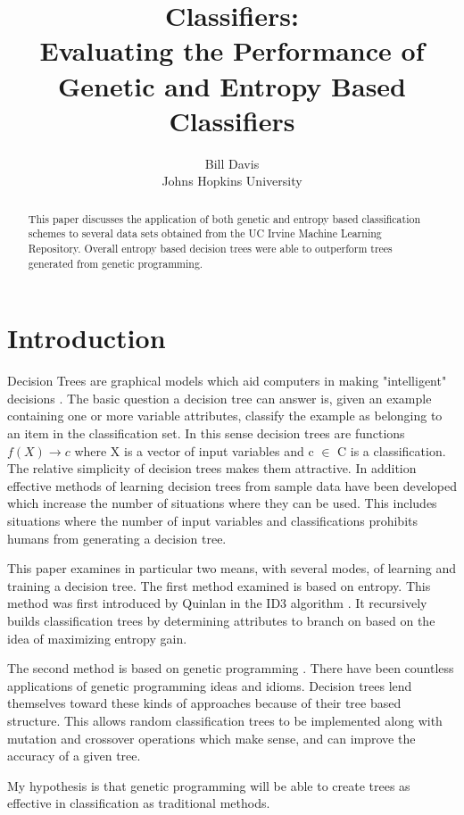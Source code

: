 \documentclass[12pt,letterpaper]{article}
\title{Classifiers: \\ Evaluating the Performance of Genetic and Entropy Based Classifiers}
\author{Bill Davis \\ Johns Hopkins University}
\begin{document}
\maketitle

\begin{abstract}
This paper discusses the application of both genetic and entropy based classification schemes to several data sets obtained from the UC Irvine Machine Learning Repository. Overall entropy based decision trees were able to outperform trees generated from genetic programming.  
\end{abstract}

\section{Introduction}
Decision Trees are graphical models which aid computers in making "intelligent" decisions \cite{aima}. The basic question a decision tree can answer is, given an example containing one or more variable attributes, classify the example as belonging to an item in the classification set. In this sense decision trees are functions $ f(X) \rightarrow c $ where X is a vector of input variables and c $\in$ C is a classification. The relative simplicity of decision trees makes them attractive. In addition effective methods of learning decision trees from sample data have been developed which increase the number of situations where they can be used. This includes situations where the number of input variables and classifications prohibits humans from generating a decision tree. 

This paper examines in particular two means, with several modes, of learning and training a decision tree. The first method examined is based on entropy. This method was first introduced by Quinlan in the ID3 algorithm \cite{Quinlan}. It recursively builds classification trees by determining attributes to branch on based on the idea of maximizing entropy gain. 

The second method is based on genetic programming \cite{genp}. There have been countless applications of genetic programming ideas and idioms. Decision trees lend themselves toward these kinds of approaches because of their tree based structure. This allows random classification trees to be implemented along with mutation and crossover operations which make sense, and can improve the accuracy of a given tree. 

My hypothesis is that genetic programming will be able to create trees as effective in classification as traditional methods. 
\end{document}
